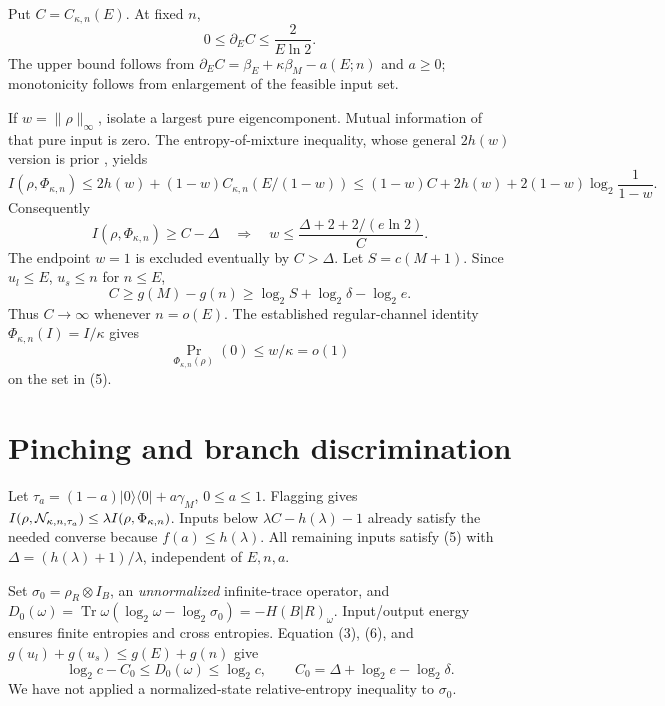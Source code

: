 \documentclass[11pt]{article}
\newcommand{\Tr}{\operatorname{Tr}}
\newcommand{\PhiT}{\Phi_{\kappa,n}}
\begin{document}
Put \(C=C_{\kappa,n}(E)\). At fixed \(n\),
\[
 0\le\partial_E C\le\frac2{E\ln2}.                            \tag{4}
\]
The upper bound follows from
\(\partial_E C=\beta_E+\kappa\beta_M-a(E;n)\) and \(a\ge0\);
monotonicity follows from enlargement of the feasible input set.

If \(w=\|\rho\|_\infty\), isolate a largest pure eigencomponent.
Mutual information of that pure input is zero. The entropy-of-mixture
inequality, whose general \(2h(w)\) version is prior
\cite[Eq.~(11), Section~5.2]{shirokov}, yields
\[
 I(\rho,\PhiT)\le2h(w)+(1-w)C_{\kappa,n}(E/(1-w))
 \le(1-w)C+2h(w)+2(1-w)\log_2\frac1{1-w}.
\]
Consequently
\[
 I(\rho,\PhiT)\ge C-\Delta
 \quad\Longrightarrow\quad
 w\le\frac{\Delta+2+2/(e\ln2)}C.                              \tag{5}
\]
The endpoint \(w=1\) is excluded eventually by \(C>\Delta\).
Let \(S=c(M+1)\). Since \(u_l\le E\), \(u_s\le n\) for \(n\le E\),
\[
 C\ge g(M)-g(n)\ge\log_2 S+\log_2\delta-\log_2 e.
 \tag{6}
\]
Thus \(C\to\infty\) whenever \(n=o(E)\).
The established regular-channel identity \(\PhiT(I)=I/\kappa\)
\cite[Proposition~2]{gain} gives
\[
 \Pr_{\PhiT(\rho)}(0)\le w/\kappa=o(1)                       \tag{7}
\]
on the set in (5).

\section{Pinching and branch discrimination}
Let \(\tau_a=(1-a)|0\rangle\langle0|+a\gamma_M\), \(0\le a\le1\).
Flagging gives \(I(\rho,{\cal N}_{\kappa,n,\tau_a})
\le\lambda I(\rho,\PhiT)\).
Inputs below \(\lambda C-h(\lambda)-1\) already satisfy the needed
converse because \(f(a)\le h(\lambda)\). All remaining inputs satisfy
(5) with \(\Delta=(h(\lambda)+1)/\lambda\), independent of \(E,n,a\).

Set \(\sigma_0=\rho_R\otimes I_B\), an \emph{unnormalized}
infinite-trace operator, and
\(D_0(\omega)=\Tr\omega(\log_2\omega-\log_2\sigma_0)
=-H(B|R)_\omega\).
Input/output energy ensures finite entropies and cross entropies.
Equation (3), (6), and \(g(u_l)+g(u_s)\le g(E)+g(n)\) give
\[
 \log_2c-C_0\le D_0(\omega)\le\log_2c,\qquad
 C_0=\Delta+\log_2e-\log_2\delta.                             \tag{8}
\]
We have not applied a normalized-state relative-entropy inequality to
\(\sigma_0\).
\end{document}
